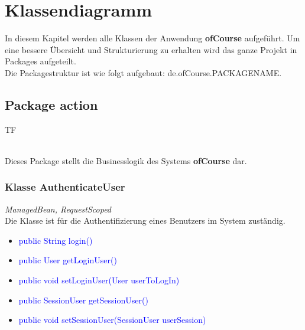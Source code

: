 \chapter{Klassendiagramm}
	\newcommand{\class}[1]{\paragraph{Klasse #1:}\ \\ }
	\newcommand{\interface}[1]{\paragraph{Interface #1:}\ \\ }
	\newcommand{\method}[1]{\textcolor{blue}{#1}}
	\newcommand{\kursiv}[1]{{\it #1}}
	\newcommand{\override}{{\it @Override}\ \\}
	
	In diesem Kapitel werden alle Klassen der Anwendung \textbf{ofCourse} aufgeführt.
	Um eine bessere Übersicht und Strukturierung zu erhalten wird das ganze Projekt in Packages aufgeteilt.\\
	Die Packagestruktur ist wie folgt aufgebaut: de.ofCourse.PACKAGENAME.
	
	\section{Package action}
	\begin{tiny}
		TF\\
	\end{tiny}\\
	Dieses Package stellt die Businesslogik des Systems \textbf{ofCourse} dar.
	\subsection{Klasse AuthenticateUser}
	\kursiv{ManagedBean, RequestScoped}\\
	Die Klasse ist für die Authentifizierung eines Benutzers im System zuständig.
	\begin{itemize}
		\item \method{public String login()}
		\item \method{public User getLoginUser()}
		\item \method{public void setLoginUser(User userToLogIn)}
		\item \method{public SessionUser getSessionUser()}
		\item \method{public void setSessionUser(SessionUser userSession)}
	\end{itemize}
	
